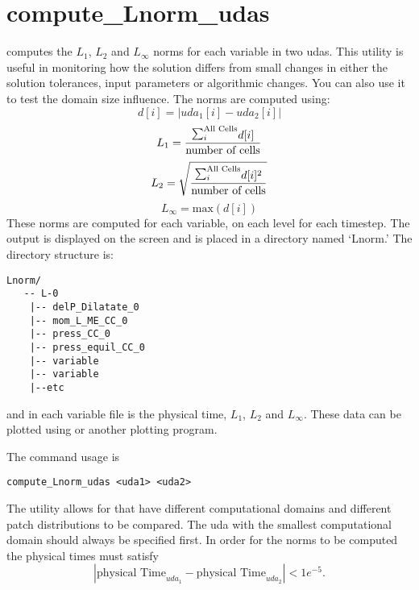 \section{compute\_Lnorm\_udas}
 computes the $L_1$, $L_2$ and $L_\infty$
norms for each variable in two udas.  This utility is useful in
monitoring how the solution differs from small changes in either the
solution tolerances, input parameters or algorithmic changes.  You can
also use it to test the domain size influence.  The norms are computed
using:
%
\begin{equation}
  d[i] = |uda_1[i] - uda_2[i]|
\end{equation}
%
\begin{equation}
  L_1 = \frac{\raise1.5pt\hbox{$\sum_i^\text{All Cells}$}d[i]}{\text{number of cells}}
\end{equation}
%
\begin{equation}
  L_2 = \sqrt{ \frac{\raise1.5pt\hbox{$\sum_i^\text{All Cells}$}d[i]^2}{\text{number of cells}} }
\end{equation}
%
\begin{equation}
  L_\infty = \text{max}(d[i])
\end{equation}
%
These norms are computed for each 
variable, on each level for each timestep.  The output is displayed on
the screen and is placed in a directory named `Lnorm.'  The directory
structure is:
%
\begin{Verbatim}[fontsize=\footnotesize]
 Lnorm/
   -- L-0
    |-- delP_Dilatate_0
    |-- mom_L_ME_CC_0
    |-- press_CC_0
    |-- press_equil_CC_0
    |-- variable
    |-- variable
    |--etc
\end{Verbatim}
%
and in each variable file is the physical time, $L_1$, $L_2$ and $L_\infty.$  These data can be plotted using  or another plotting program.

The command usage is
%
\begin{Verbatim}[fontsize=\footnotesize]
  compute_Lnorm_udas <uda1> <uda2>
\end{Verbatim}
%
The utility allows for  that have different computational
domains and different patch distributions to be compared.  The uda
with the smallest computational domain should always be specified
first.
%
In order for the norms to be computed the physical times must satisfy
\begin{equation*}
| \text{physical Time}_{uda_1} - \text{physical Time}_{uda_2}| < 1e^{-5}.
\end{equation*}

